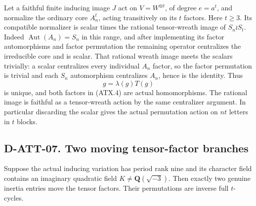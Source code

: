 Let a faithful finite inducing image $J$ act on
$V=W^{\otimes t}$, of degree $e=a^t$, and normalize the ordinary
core $A_n^t$, acting transitively on its $t$ factors.  Here $t\ge3$.
Its compatible normalizer is scalar times the rational tensor-wreath
image of $S_n\wr S_t$.  Indeed $\operatorname{Aut}(A_n)=S_n$ in
this range, and after implementing its factor automorphisms and
factor permutation the remaining operator centralizes the irreducible
core and is scalar.  That rational wreath image meets the scalars
trivially: a scalar centralizes every individual $A_n$ factor, so the
factor permutation is trivial and each $S_n$ automorphism centralizes
$A_n$, hence is the identity.  Thus
\[
                  g=\lambda(g)T(g)
 \tag{ATX.4}
\]
is unique, and both factors in (ATX.4) are actual homomorphisms.
The rational image is faithful as a tensor-wreath action by the
same centralizer argument.  In particular discarding the scalar
gives the actual permutation action on $nt$ letters in $t$ blocks.

\subsection*{D-ATT-07. Two moving tensor-factor branches}

\begin{lemma}[D-ATT-07]
Suppose the actual inducing variation has period rank nine and its
character field contains an imaginary quadratic field
$K\ne\mathbf Q(\sqrt{-3})$.  Then exactly two genuine inertia
entries move the tensor factors.  Their permutations are inverse
full $t$-cycles.
\end{lemma}


